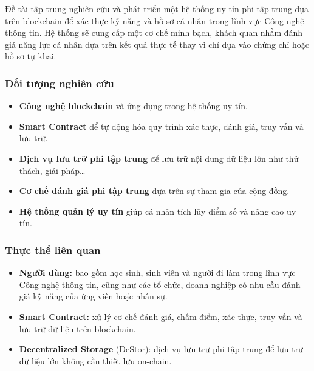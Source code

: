Đề tài tập trung nghiên cứu và phát triển một hệ thống uy tín phi tập trung dựa trên blockchain để xác thực kỹ năng và hồ sơ cá nhân trong lĩnh vực Công nghệ thông tin.
Hệ thống sẽ cung cấp một cơ chế minh bạch, khách quan nhằm đánh giá năng lực cá nhân dựa trên kết quả thực tế thay vì chỉ dựa vào chứng chỉ hoặc hồ sơ tự khai.

\subsubsection{Đối tượng nghiên cứu}
\begin{itemize}
  \item \textbf{Công nghệ blockchain} và ứng dụng trong hệ thống uy tín.
  \item \textbf{Smart Contract} để tự động hóa quy trình xác thực, đánh giá, truy vấn và lưu trữ.
  \item \textbf{Dịch vụ lưu trữ phi tập trung} để lưu trữ nội dung dữ liệu lớn như thử thách, giải pháp\dots
  \item \textbf{Cơ chế đánh giá phi tập trung} dựa trên sự tham gia của cộng đồng.
  \item \textbf{Hệ thống quản lý uy tín} giúp cá nhân tích lũy điểm số và nâng cao uy tín.
\end{itemize}

\subsubsection{Thực thể liên quan}
\begin{itemize}
  \item \textbf{Người dùng:} bao gồm học sinh, sinh viên và người đi làm trong lĩnh vực Công nghệ thông tin, cũng như các tổ chức, doanh nghiệp có nhu cầu đánh giá kỹ năng của ứng viên hoặc nhân sự.
  \item \textbf{Smart Contract:} xử lý cơ chế đánh giá, chấm điểm, xác thực, truy vấn và lưu trữ dữ liệu trên blockchain.
  \item \textbf{Decentralized Storage} (DeStor): dịch vụ lưu trữ phi tập trung để lưu trữ dữ liệu lớn không cần thiết lưu on-chain.
\end{itemize}


